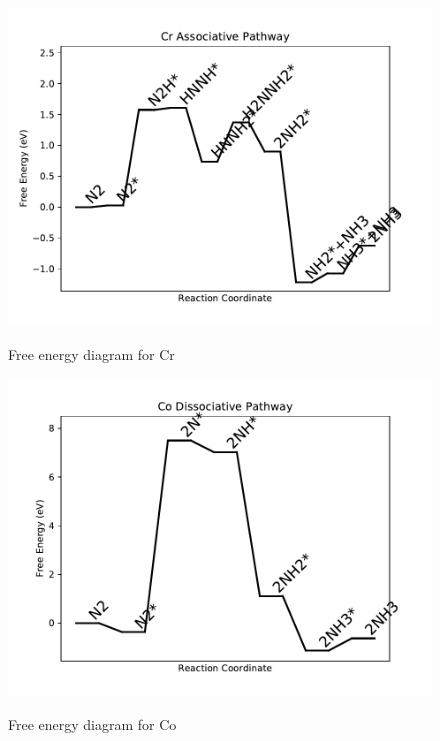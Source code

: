 \documentclass[journal=jacsat,manuscript=article]{achemso}
\begin{document}
\begin{figure}
\includegraphics[width=1\linewidth]{data/plots/Cr_associative.pdf}
\label{fig:Cr_associative}
\caption{Free energy diagram for Cr}
\end{figure}

\newpage
\begin{figure}
\includegraphics[width=1\linewidth]{data/plots/Co_dissociative.pdf}
\label{fig:Co_dissociative}
\caption{Free energy diagram for Co}
\end{figure}
\end{document}
